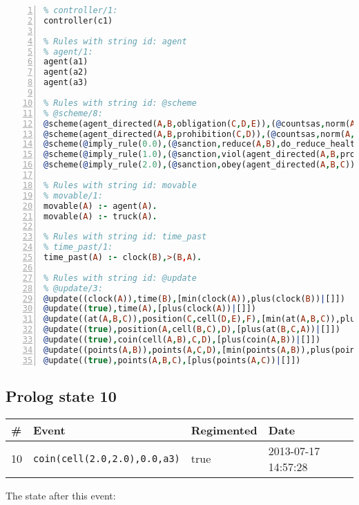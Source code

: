 \documentclass[11pt]{article}\usepackage[utf8]{inputenc}\usepackage{geometry}
\begin{document}
\begin{lstlisting}[language=Prolog, numbers=left]
% Rules with string id: controller
% controller/1:
controller(c1)

% Rules with string id: agent
% agent/1:
agent(a1)
agent(a2)
agent(a3)

% Rules with string id: @scheme
% @scheme/8:
@scheme(agent_directed(A,B,obligation(C,D,E)),(@countsas,norm(A,B,F,obligation(C,D,E)),F),false,(listTrue(C)),(time_past(D)),false,[plus(viol(agent_directed(A,B,obligation(C,D,E))))|[]],[plus(obey(agent_directed(A,B,obligation(C,D,E))))|[]])
@scheme(agent_directed(A,B,prohibition(C,D)),(@countsas,norm(A,B,E,prohibition(C,D)),E),(listTrue(C)),false,(false),false,[plus(viol(agent_directed(A,B,prohibition(C,D))))|[]],[plus(obey(agent_directed(A,B,prohibition(C,D))))|[]])
@scheme(@imply_rule(0.0),(@sanction,reduce(A,B),do_reduce_health(A,B),notifyAgent(A,changed(status))),true,false,false,false,[min(reduce(A,B))|[]],[])
@scheme(@imply_rule(1.0),(@sanction,viol(agent_directed(A,B,prohibition(C,D))),do_sanction(D)),true,false,false,false,[min(viol(agent_directed(A,B,prohibition(C,D))))|[]],[])
@scheme(@imply_rule(2.0),(@sanction,obey(agent_directed(A,B,C))),true,false,false,false,[min(obey(agent_directed(A,B,C)))|[]],[])

% Rules with string id: movable
% movable/1:
movable(A) :- agent(A).
movable(A) :- truck(A).

% Rules with string id: time_past
% time_past/1:
time_past(A) :- clock(B),>(B,A).

% Rules with string id: @update
% @update/3:
@update((clock(A)),time(B),[min(clock(A)),plus(clock(B))|[]])
@update((true),time(A),[plus(clock(A))|[]])
@update((at(A,B,C)),position(C,cell(D,E),F),[min(at(A,B,C)),plus(at(D,E,C))|[]])
@update((true),position(A,cell(B,C),D),[plus(at(B,C,A))|[]])
@update((true),coin(cell(A,B),C,D),[plus(coin(A,B))|[]])
@update((points(A,B)),points(A,C,D),[min(points(A,B)),plus(points(A,D))|[]])
@update((true),points(A,B,C),[plus(points(A,C))|[]])

\end{lstlisting}
\clearpage 
\subsection{Prolog state 10}
\begin{table}[ht]
\centering 
\begin{tabular}{l l l l} 
\textbf{\#} & \textbf{Event} & \textbf{Regimented} & \textbf{Date} \\ [0.5ex] 
\hline
10&\texttt{coin(cell(2.0,2.0),0.0,a3)}&true&2013-07-17 14:57:28\\ [1ex] \hline\end{tabular}
\end{table}
The state after this event:
\end{document}
